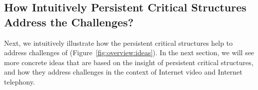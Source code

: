 








\subsection{How Intuitively Persistent Critical Structures Address the Challenges?}
Next, we intuitively illustrate how the persistent critical structures help to address 
challenges of \ddn (Figure~\ref{fig:overview:ideas}).
In the next section, we will see more concrete ideas that are based on the insight 
of persistent critical structures, and how they address challenges in the context of
Internet video and Internet telephony.


